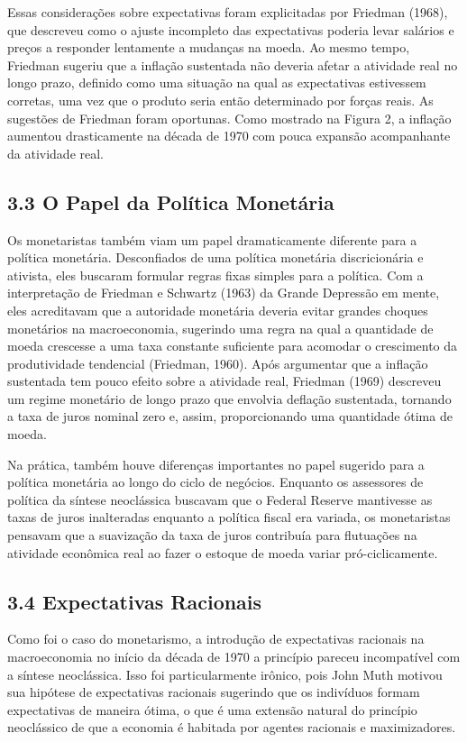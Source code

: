\documentclass[12pt]{article}
\begin{document}
Essas considerações sobre expectativas foram explicitadas por Friedman (1968), que descreveu como o ajuste incompleto das expectativas poderia levar salários e preços a responder lentamente a mudanças na moeda. Ao mesmo tempo, Friedman sugeriu que a inflação sustentada não deveria afetar a atividade real no longo prazo, definido como uma situação na qual as expectativas estivessem corretas, uma vez que o produto seria então determinado por forças reais. As sugestões de Friedman foram oportunas. Como mostrado na Figura 2, a inflação aumentou drasticamente na década de 1970 com pouca expansão acompanhante da atividade real.

\subsection{3.3 O Papel da Política Monetária}

Os monetaristas também viam um papel dramaticamente diferente para a política monetária. Desconfiados de uma política monetária discricionária e ativista, eles buscaram formular regras fixas simples para a política. Com a interpretação de Friedman e Schwartz (1963) da Grande Depressão em mente, eles acreditavam que a autoridade monetária deveria evitar grandes choques monetários na macroeconomia, sugerindo uma regra na qual a quantidade de moeda crescesse a uma taxa constante suficiente para acomodar o crescimento da produtividade tendencial (Friedman, 1960). Após argumentar que a inflação sustentada tem pouco efeito sobre a atividade real, Friedman (1969) descreveu um regime monetário de longo prazo que envolvia deflação sustentada, tornando a taxa de juros nominal zero e, assim, proporcionando uma quantidade ótima de moeda.

Na prática, também houve diferenças importantes no papel sugerido para a política monetária ao longo do ciclo de negócios. Enquanto os assessores de política da síntese neoclássica buscavam que o Federal Reserve mantivesse as taxas de juros inalteradas enquanto a política fiscal era variada, os monetaristas pensavam que a suavização da taxa de juros contribuía para flutuações na atividade econômica real ao fazer o estoque de moeda variar pró-ciclicamente.

\subsection{3.4 Expectativas Racionais}

Como foi o caso do monetarismo, a introdução de expectativas racionais na macroeconomia no início da década de 1970 a princípio pareceu incompatível com a síntese neoclássica. Isso foi particularmente irônico, pois John Muth motivou sua hipótese de expectativas racionais sugerindo que os indivíduos formam expectativas de maneira ótima, o que é uma extensão natural do princípio neoclássico de que a economia é habitada por agentes racionais e maximizadores.
\end{document}
